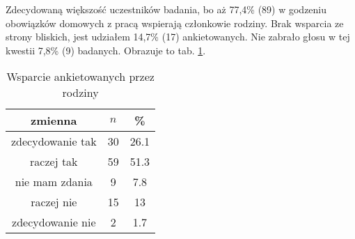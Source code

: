 


Zdecydowaną większość uczestników badania, bo aż 77,4\% (89) w godzeniu obowiązków  domowych z pracą wspierają członkowie rodziny. Brak wsparcia ze strony bliskich, jest udziałem 14,7\% (17) ankietowanych. Nie zabrało głosu w tej kwestii 7,8\% (9) badanych. Obrazuje to tab. \ref{tab:Q26}.





\begin{table}[H]
\caption{Wsparcie ankietowanych przez rodziny}
\centering
\begin{tabular}{ | c | c | c |}
\hline
zmienna & $n$ & \% \\
\hline
zdecydowanie tak  &  30  & 26.1 \\
\hline
raczej tak  &  59  & 51.3 \\
\hline
nie mam zdania  &  9  & 7.8 \\
\hline
raczej nie  &  15  & 13 \\
\hline
zdecydowanie nie  &  2  & 1.7\\
\hline
\end{tabular}
\label{tab:Q26}
\end{table}
